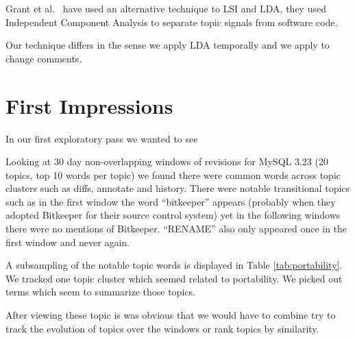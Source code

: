 \documentclass[times, 10pt,twocolumn]{article}
\begin{document}
Grant et al.~\cite{scottcordy} have used an alternative technique to
LSI and LDA, they used Independent Component Analysis to separate
topic signals from software code.

Our technique differs in the sense we apply LDA temporally and we
apply to change comments.



\section{First Impressions}

In our first exploratory pass we wanted to see 

Looking at 30 day non-overlapping windows of revisions for MySQL 3.23
(20 topics, top 10 words per topic) we found there were common words
across topic clusters such as diffs, annotate and history. There were
notable transitional topics such as in the first window the word
``bitkeeper'' appears (probably when they adopted Bitkeeper for their
source control system) yet in the following windows there were no
mentions of Bitkeeper. ``RENAME'' also only appeared once in the first
window and never again.

A subsampling of the notable topic words is displayed in Table
\ref{tab:portability}. We tracked one topic cluster which seemed
related to portability. We picked out terms which seem to summarize
those topics.


After viewing these topic is was obvious that we would have to combine
try to track the evolution of topics over the windows or rank topics
by similarity.

\end{document}

